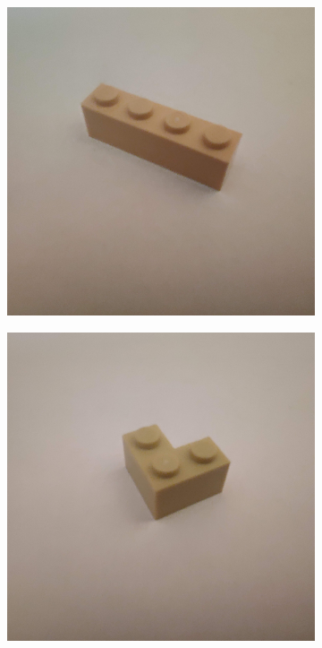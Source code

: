 \documentclass[]{article}
\begin{document}
\begin{figure}[h]
\begin{subfigure}[b]{0.2\textwidth}
    \end{subfigure}
    \begin{subfigure}[b]{0.2\textwidth}
        \includegraphics[width=\textwidth]{photographed images/13.jpg}
    \end{subfigure}
    \begin{subfigure}[b]{0.2\textwidth}
        \includegraphics[width=\textwidth]{photographed images/14.jpg}

\end{subfigure}
\end{figure}
\end{document}
